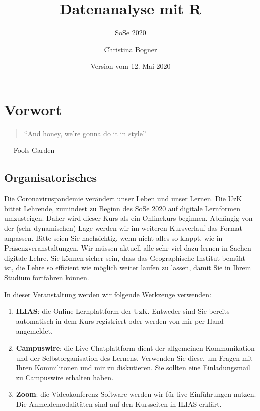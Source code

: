 \documentclass[]{book}
\title{Datenanalyse mit R}
\subtitle{SoSe 2020}
\author{Christina Bogner}
\date{Version vom 12. Mai 2020}
\providecommand{\tightlist}{%
  \setlength{\itemsep}{0pt}\setlength{\parskip}{0pt}}
\newenvironment{rmdinfo}{
  \definecolor{info}{rgb}{0.94, 0.97, 1.0}  %
  \color{black}
  \begin{mdframed}[backgroundcolor = info]}
 {\end{mdframed}}
\begin{document}
\maketitle

{
\setcounter{tocdepth}{1}
\tableofcontents
}
\hypertarget{vorwort}{%
\chapter{Vorwort}\label{vorwort}}

\begin{quote}
``And honey, we're gonna do it in style''
\end{quote}

\hfill --- Fools Garden

\hypertarget{organisatorisches}{%
\section{Organisatorisches}\label{organisatorisches}}

\begin{rmdinfo}
Die Coronaviruspandemie verändert unser Leben und unser Lernen. Die UzK
bittet Lehrende, zumindest zu Beginn des SoSe 2020 auf digitale
Lernformen umzusteigen. Daher wird dieser Kurs als ein Onlinekurs
beginnen. Abhängig von der (sehr dynamischen) Lage werden wir im
weiteren Kursverlauf das Format anpassen. Bitte seien Sie nachsichtig,
wenn nicht alles so klappt, wie in Präsenzveranstaltungen. Wir müssen
aktuell alle sehr viel dazu lernen in Sachen digitale Lehre. Sie können
sicher sein, dass das Geographische Institut bemüht ist, die Lehre so
effizient wie möglich weiter laufen zu lassen, damit Sie in Ihrem
Studium fortfahren können.
\end{rmdinfo}

In dieser Veranstaltung werden wir folgende Werkzeuge verwenden:

\begin{enumerate}
\def\labelenumi{\arabic{enumi}.}
\tightlist
\item
  \textbf{ILIAS}: die Online-Lernplattform der UzK. Entweder sind Sie bereits automatisch in dem Kurs registriert oder werden von mir per Hand angemeldet.
\item
  \textbf{Campuswire}: die Live-Chatplattform dient der allgemeinen Kommunikation und der Selbstorganisation des Lernens. Verwenden Sie diese, um Fragen mit Ihren Kommilitonen und mir zu diskutieren. Sie sollten eine Einladungsmail zu Campuswire erhalten haben.
\item
  \textbf{Zoom}: die Videokonferenz-Software werden wir für live Einführungen nutzen. Die Anmeldemodalitäten sind auf den Kursseiten in ILIAS erklärt.
\end{enumerate}
\end{document}
